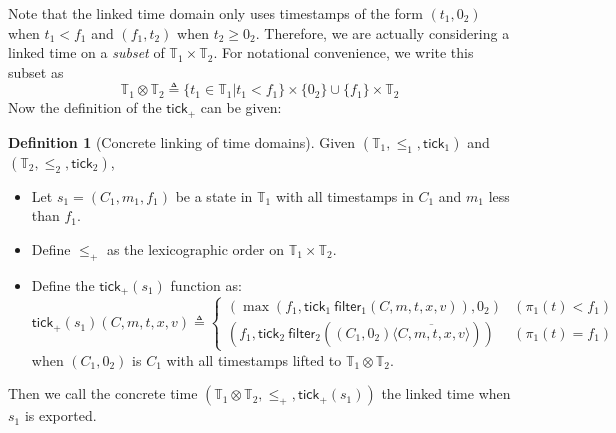 \documentclass[acmsmall,review]{acmart}\settopmatter{printfolios=true,printccs=false,printacmref=false}
\theoremstyle{definition}
\newtheorem{definition}{Definition}[section]
\newcommand*{\Time}{\mathbb{T}}
\newcommand*{\mem}{m}
\newcommand*{\tick}{\mathsf{tick}}
\newcommand*{\delete}[2]{{#1}\overline{\langle{#2}\rangle}}
\newcommand*{\filter}{\mathsf{filter}}
\begin{document}
Note that the linked time domain only uses timestamps of the form $(t_1,0_2)$ when $t_1<f_1$ and $(f_1,t_2)$ when $t_2\ge 0_2$.
Therefore, we are actually considering a linked time on a \emph{subset} of $\Time_1\times\Time_2$.
For notational convenience, we write this subset as
\[\Time_1\otimes\Time_2\triangleq\{t_1\in\Time_1|t_1<f_1\}\times\{0_2\}\cup\{f_1\}\times\Time_2\]
Now the definition of the $\tick_+$ can be given:
\begin{definition}[Concrete linking of time domains]
  Given $(\Time_1,\le_1,\tick_1)$ and $(\Time_2,\le_2,\tick_2)$,

  \begin{itemize}
    \item Let ${s_1}=({C_1},{\mem_1},{f_1})$ be a state in $\Time_1$ with all timestamps in $C_1$ and $m_1$ less than $f_1$.
    \item Define $\le_+$ as the lexicographic order on $\Time_1\times\Time_2$.
    \item Define the ${\tick_{+}}({s_1})$ function as:
          \[
            \tick_{+}({s_1})({C},\mem,{t},x,{v})\triangleq
            \begin{cases}
              (\max(f_1,\tick_1\:\filter_1(C,\mem,t,x,v)), 0_2)                 & (\pi_1(t)<f_1) \\
              (f_1,\tick_2\:\filter_2(\delete{{(C_1,0_2)}}{C,\mem, {t},x,{v}})) & (\pi_1(t)=f_1)
            \end{cases}
          \]
          when $(C_1,0_2)$ is $C_1$ with all timestamps lifted to $\Time_1\otimes\Time_2$.
  \end{itemize}

  Then we call the concrete time $(\Time_1\otimes\Time_2,\le_+,\tick_{+}({s_1}))$ the linked time when $s_1$ is exported.
\end{definition}
\end{document}
